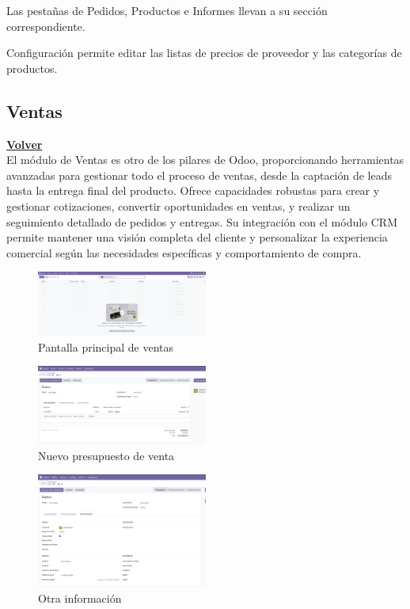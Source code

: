 \documentclass[a4paper,12pt]{article}
\begin{document}
Las pestañas de Pedidos, Productos e Informes llevan a su sección correspondiente.

Configuración permite editar las listas de precios de proveedor y las categorías de productos.


\subsection{Ventas}
\hyperlink{anchor-indice}{\textbf{Volver}}\\

El módulo de Ventas es otro de los pilares de Odoo, proporcionando herramientas avanzadas para gestionar todo el proceso de ventas, desde la captación de leads hasta la entrega final del producto.
Ofrece capacidades robustas para crear y gestionar cotizaciones, convertir oportunidades en ventas, y realizar un seguimiento detallado de pedidos y entregas. Su integración con el módulo CRM permite mantener una visión completa del cliente y personalizar la experiencia comercial según las necesidades específicas y comportamiento de compra.

\begin{figure}[h!]
    \centering
    \includegraphics[width=0.5\textwidth]{pr2odoo40-pantallaPrincipalVentas.png}
    \caption{Pantalla principal de ventas}
\end{figure}
\FloatBarrier

\begin{figure}[h!]
    \centering
    \includegraphics[width=0.5\textwidth]{pr2odoo41-nuevoPresupuesto.png}
    \caption{Nuevo presupuesto de venta}
\end{figure}
\FloatBarrier

\begin{figure}[h!]
    \centering
    \includegraphics[width=0.5\textwidth]{pr2odoo42-otraInfo.png}
    \caption{Otra información}
\end{figure}
\FloatBarrier
\end{document}
